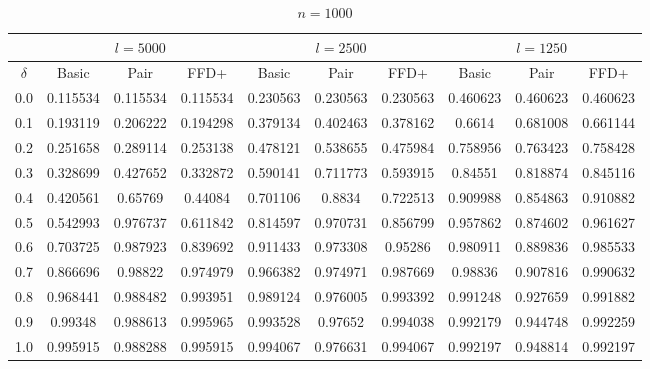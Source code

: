 \documentclass[oribibl]{llncs}
\begin{document}
\begin{table}[!htb]
	\centering
	\caption{$n = 1000$}
	\begin{tabular}{c@{\hspace{15pt}}c@{\hspace{10pt}}c@{\hspace{10pt}}c@{\hspace{7pt}}| @{\hspace{7pt}}c@{\hspace{10pt}}c@{\hspace{10pt}}c@{\hspace{7pt}}| @{\hspace{7pt}} c@{\hspace{10pt}}c@{\hspace{10pt}}c}
		\noalign{\smallskip}
		& \multicolumn{3}{c}{$l = 5000$} & \multicolumn{3}{c}{$l = 2500$} & \multicolumn{3}{c}{$l = 1250$} \\
		\hline\noalign{\smallskip}
		$\delta$ & Basic & Pair & FFD+ & Basic & Pair & FFD+ & Basic & Pair & FFD+ \\
		\noalign{\smallskip}
		\hline
		\noalign{\smallskip}
		0.0	&0.115534&	0.115534&	0.115534&	0.230563&	0.230563&	0.230563&	0.460623&	0.460623&	0.460623 \\
		0.1	&0.193119&	0.206222&	0.194298&	0.379134&	0.402463&	0.378162&	0.6614&	0.681008&	0.661144 \\
		0.2	&0.251658&	0.289114&	0.253138&	0.478121&	0.538655&	0.475984&	0.758956&	0.763423&	0.758428 \\
		0.3	&0.328699&	0.427652&	0.332872&	0.590141&	0.711773&	0.593915&	0.84551&	0.818874&	0.845116 \\
		0.4	&0.420561&	0.65769&	0.44084&	0.701106&	0.8834&	0.722513&	0.909988&	0.854863&	0.910882 \\
		0.5	&0.542993&	0.976737&	0.611842&	0.814597&	0.970731&	0.856799&	0.957862&	0.874602&	0.961627 \\
		0.6	&0.703725&	0.987923&	0.839692&	0.911433&	0.973308&	0.95286&	0.980911&	0.889836&	0.985533 \\
		0.7	&0.866696&	0.98822	& 0.974979&	0.966382&	0.974971&	0.987669&	0.98836&	0.907816&	0.990632 \\
		0.8	&0.968441&	0.988482&	0.993951&	0.989124&	0.976005&	0.993392&	0.991248&	0.927659&	0.991882 \\
		0.9	&0.99348&	0.988613&	0.995965&	0.993528&	0.97652&	0.994038&	0.992179&	0.944748&	0.992259 \\
		1.0	&0.995915&	0.988288&	0.995915&	0.994067&	0.976631&	0.994067&	0.992197&	0.948814&	0.992197 \\
		\hline
	\end{tabular}
	\label{table:n1000}
\end{table}	







\end{document}
